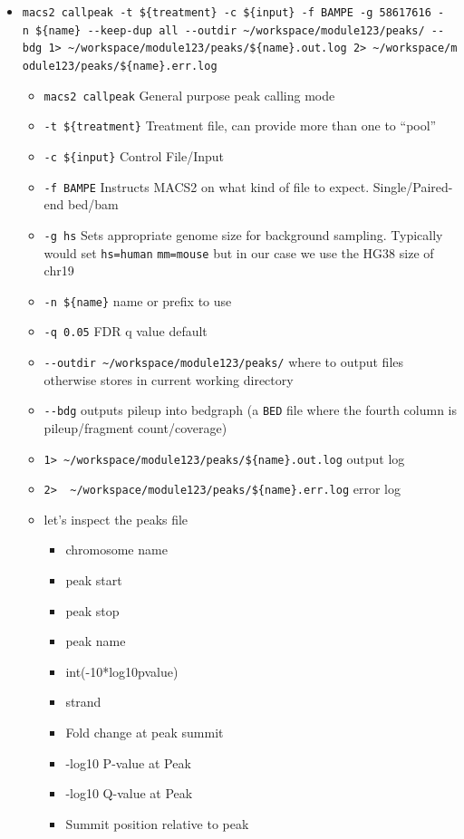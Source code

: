 \documentclass[
]{book}
\providecommand{\tightlist}{%
  \setlength{\itemsep}{0pt}\setlength{\parskip}{0pt}}
\begin{document}
\begin{itemize}
\tightlist
\item
  \texttt{macs2\ callpeak\ -t\ \$\{treatment\}\ -c\ \$\{input\}\ -f\ BAMPE\ -g\ 58617616\ -n\ \$\{name\}\ -\/-keep-dup\ all\ -\/-outdir\ \textasciitilde{}/workspace/module123/peaks/\ -\/-bdg\ 1\textgreater{}\ \textasciitilde{}/workspace/module123/peaks/\$\{name\}.out.log\ 2\textgreater{}\ \textasciitilde{}/workspace/module123/peaks/\$\{name\}.err.log}

  \begin{itemize}
  \tightlist
  \item
    \texttt{macs2\ callpeak} General purpose peak calling mode
  \item
    \texttt{-t\ \$\{treatment\}} Treatment file, can provide more than one to ``pool''
  \item
    \texttt{-c\ \$\{input\}} Control File/Input
  \item
    \texttt{-f\ BAMPE} Instructs MACS2 on what kind of file to expect. Single/Paired-end bed/bam
  \item
    \texttt{-g\ hs} Sets appropriate genome size for background sampling. Typically would set \texttt{hs=human} \texttt{mm=mouse} but in our case we use the HG38 size of chr19
  \item
    \texttt{-n\ \$\{name\}} name or prefix to use
  \item
    \texttt{-q\ 0.05} FDR q value default
  \item
    \texttt{-\/-outdir\ \textasciitilde{}/workspace/module123/peaks/} where to output files otherwise stores in current working directory
  \item
    \texttt{-\/-bdg} outputs pileup into bedgraph (a \texttt{BED} file where the fourth column is pileup/fragment count/coverage)
  \item
    \texttt{1\textgreater{}\ \textasciitilde{}/workspace/module123/peaks/\$\{name\}.out.log} output log
  \item
    \texttt{2\textgreater{}\ \ \textasciitilde{}/workspace/module123/peaks/\$\{name\}.err.log} error log
  \item
    let's inspect the peaks file

    \begin{itemize}
    \tightlist
    \item
      chromosome name
    \item
      peak start
    \item
      peak stop
    \item
      peak name
    \item
      int(-10*log10pvalue)
    \item
      strand
    \item
      Fold change at peak summit
    \item
      -log10 P-value at Peak
    \item
      -log10 Q-value at Peak
    \item
      Summit position relative to peak
    \end{itemize}
  \end{itemize}
\end{itemize}
\end{document}

